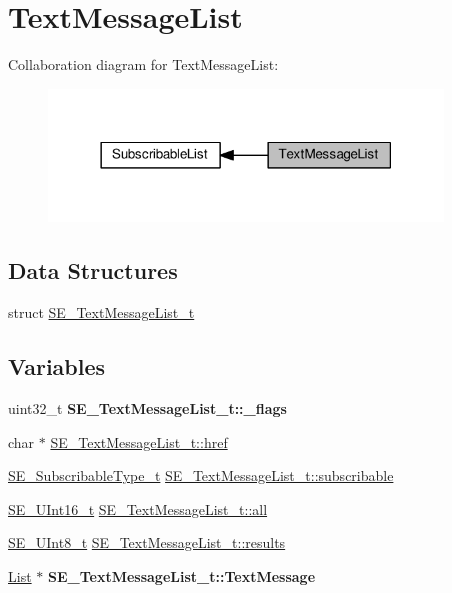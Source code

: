 \hypertarget{group__TextMessageList}{}\section{Text\+Message\+List}
\label{group__TextMessageList}
Collaboration diagram for Text\+Message\+List\+:\nopagebreak
\begin{figure}[H]
\begin{center}
\leavevmode
\includegraphics[width=297pt]{group__TextMessageList}
\end{center}
\end{figure}
\subsection*{Data Structures}
\begin{DoxyCompactItemize}
\item 
struct \hyperlink{structSE__TextMessageList__t}{S\+E\+\_\+\+Text\+Message\+List\+\_\+t}
\end{DoxyCompactItemize}
\subsection*{Variables}
\begin{DoxyCompactItemize}
\item 
\mbox{\label{group__TextMessageList_ga8febc10d5f60436fde45aa4e7dfb7a13}} 
uint32\+\_\+t {\bfseries S\+E\+\_\+\+Text\+Message\+List\+\_\+t\+::\+\_\+flags}
\item 
char $\ast$ \hyperlink{group__TextMessageList_ga20a37c16ba898b155d07ffbabba88d71}{S\+E\+\_\+\+Text\+Message\+List\+\_\+t\+::href}
\item 
\hyperlink{group__SubscribableType_ga5c41f553d369710ed34619266bf2551e}{S\+E\+\_\+\+Subscribable\+Type\+\_\+t} \hyperlink{group__TextMessageList_ga4c361e5636bcdbbb0dbf66d4f2ea106e}{S\+E\+\_\+\+Text\+Message\+List\+\_\+t\+::subscribable}
\item 
\hyperlink{group__UInt16_gac68d541f189538bfd30cfaa712d20d29}{S\+E\+\_\+\+U\+Int16\+\_\+t} \hyperlink{group__TextMessageList_gae0e3024c0f3f00ac06820200dd03e8f7}{S\+E\+\_\+\+Text\+Message\+List\+\_\+t\+::all}
\item 
\hyperlink{group__UInt8_gaf7c365a1acfe204e3a67c16ed44572f5}{S\+E\+\_\+\+U\+Int8\+\_\+t} \hyperlink{group__TextMessageList_ga1ddf4d774f7b963a68dd927dbd8ab2b3}{S\+E\+\_\+\+Text\+Message\+List\+\_\+t\+::results}
\item 
\mbox{\label{group__TextMessageList_gad3de6e08cd09bc49f9e11ce6be2c6470}} 
\hyperlink{structList}{List} $\ast$ {\bfseries S\+E\+\_\+\+Text\+Message\+List\+\_\+t\+::\+Text\+Message}
\end{DoxyCompactItemize}


